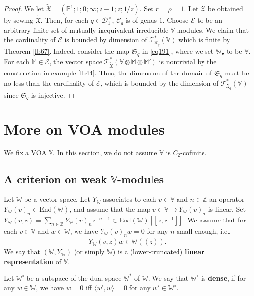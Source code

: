 \documentclass[12pt,b5paper,notitlepage]{report}
\theoremstyle{definition}
\theoremstyle{plain}
\newcommand{\fk}{\mathfrak}
\newcommand{\mc}{\mathcal}
\newcommand{\wtd}{\widetilde}
\newcommand{\End}{\mathrm{End}} %
\newcommand{\bk}[1]{\langle {#1}\rangle}
\newcommand{\scr}{\mathscr}
\newcommand{\blt}{\bullet}
\newcommand{\Vbb}{\mathbb V}
\newcommand{\Wbb}{\mathbb W}
\newcommand{\Mbb}{\mathbb M}
\newcommand{\Zbb}{\mathbb Z}
\newcommand{\Pbb}{\mathbb P}
\numberwithin{equation}{section}
\begin{document}
\begin{proof}
We let $\wtd{\fk X}=(\Pbb^1;1;0;\infty;z-1;z;1/z)$. Set $r=\rho=1$. Let $\fk X$ be obtained by sewing $\wtd{\fk X}$. Then, for each $q\in\mc D_1^\times$, $\mc C_q$ is of genus $1$. Choose $\mc E$ to be an arbitrary finite set of mutually inequivalent irreducible $\Vbb$-modules. We claim that the cardinality of $\mc E$ is bounded by dimension of $\scr T_{\fk X_q}^*(\Vbb)$ which is finite by Theorem \ref{lb67}. Indeed, consider the map $\fk S_q$ in \eqref{eq191}, where we set $\Wbb_\blt$ to be $\Vbb$. For each $\Mbb\in\mc E$, the vector space $\scr T_{\wtd {\fk X}}^*(\Vbb\otimes\Mbb\otimes\Mbb')$ is nontrivial by the construction in example \ref{lb44}. Thus, the dimension of the domain of $\fk S_q$ must be no less than the cardinality of $\mc E$, which is bounded by the dimension of $\scr T_{\fk X_q}^*(\Vbb)$ since $\fk S_q$ is injective.
\end{proof}





\section{More on VOA modules}

We fix a  VOA $\Vbb$. In this section, we do not assume $\Vbb$ is $C_2$-cofinite.

\subsection*{A criterion on weak $\Vbb$-modules}



Let $\Wbb$ be a vector space. Let $Y_\Wbb$ associates to each $v\in\Vbb$ and $n\in\Zbb$ an operator $Y_\Wbb(v)_n\in\End(\Wbb)$, and assume that the map $v\in\Vbb\mapsto Y_\Wbb(v)_n$ is linear. Set $Y_\Wbb(v,z)=\sum_{n\in\Zbb}Y_\Wbb(v)_nz^{-n-1}\in \End(\Wbb)[[z,z^{-1}]]$. We assume that for each $v\in\Vbb$ and $w\in\Wbb$, we have $Y_\Wbb(v)_nw=0$ for any $n$ small enough, i.e.,
\begin{align*}
Y_\Wbb(v,z)w\in\Wbb((z)).
\end{align*}
We say that $(\Wbb,Y_\Wbb)$ (or simply $\Wbb$) is a (lower-truncated) \textbf{linear representation} of $\Vbb$. 

Let $\Wbb^\circ$ be a subspace of the dual space $\Wbb^*$ of $\Wbb$. We say that $\Wbb^\circ$ is \textbf{dense}, if for any $w\in\Wbb$, we have $w=0$ iff $\bk{w',w}=0$ for any $w'\in\Wbb^\circ$. 
\end{document}
